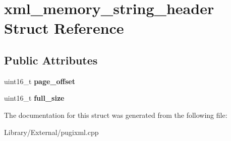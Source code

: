 \hypertarget{structxml__memory__string__header}{}\section{xml\+\_\+memory\+\_\+string\+\_\+header Struct Reference}
\label{structxml__memory__string__header}
\subsection*{Public Attributes}
\begin{DoxyCompactItemize}
\item 
\hypertarget{structxml__memory__string__header_a0cc274672f1263f73eeb6bf839bf96ee}{}uint16\+\_\+t {\bfseries page\+\_\+offset}\label{structxml__memory__string__header_a0cc274672f1263f73eeb6bf839bf96ee}

\item 
\hypertarget{structxml__memory__string__header_abbb48a709081e6610dffad322499e3f7}{}uint16\+\_\+t {\bfseries full\+\_\+size}\label{structxml__memory__string__header_abbb48a709081e6610dffad322499e3f7}

\end{DoxyCompactItemize}


The documentation for this struct was generated from the following file\+:\begin{DoxyCompactItemize}
\item 
Library/\+External/pugixml.\+cpp\end{DoxyCompactItemize}
